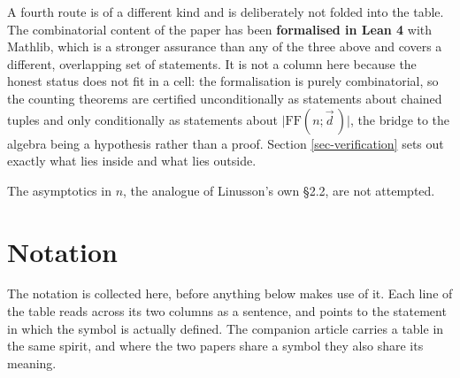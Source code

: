 \documentclass[11pt, a4paper, abstract=yes]{scrartcl}
\theoremstyle{definition}
\theoremstyle{remark}
\theoremstyle{plain}
\begin{document}
A fourth route is of a different kind and is deliberately not folded into the table. The
combinatorial content of the paper has been \textbf{formalised in Lean 4} with Mathlib, which is a stronger
assurance than any of the three above and covers a different, overlapping set of statements. It is
not a column here because the honest status does not fit in a cell: the formalisation is purely
combinatorial, so the counting theorems are certified unconditionally as statements about chained
tuples and only conditionally as statements about \(\lvert\mathrm{FF}(n;\vec d\,)\rvert\), the bridge to
the algebra being a hypothesis rather than a proof. Section \ref{sec-verification} sets out exactly
what lies inside and what lies outside.

The asymptotics in \(n\), the analogue of Linusson's own \S2.2, are not attempted.
\section{Notation}
\label{sec-notation}
The notation is collected here, before anything below makes use of it. Each line of the table reads
across its two columns as a sentence, and points to the statement in which the symbol is actually
defined. The companion article carries a table in the same spirit, and where the two papers share a
symbol they also share its meaning.
\end{document}
